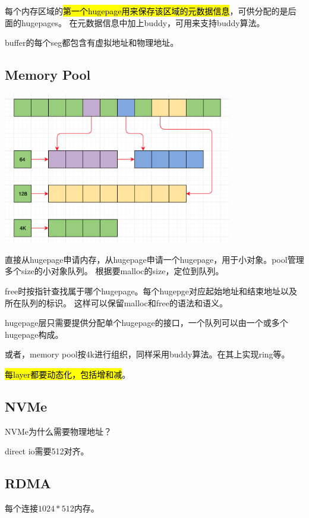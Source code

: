每个内存区域的\hl{第一个hugepage用来保存该区域的元数据信息}，可供分配的是后面的hugepages。
在元数据信息中加上buddy，可用来支持buddy算法。

buffer的每个seg都包含有虚拟地址和物理地址。

\subsection{Memory Pool}

\begin{center}
    \includegraphics[width=10cm]{../imgs/memory-pool.png}
\end{center}

直接从hugepage申请内存，从hugepage申请一个hugepage，用于小对象。pool管理多个size的小对象队列。
根据要malloc的size，定位到队列。

free时按指针查找属于哪个hugepage。每个hugepge对应起始地址和结束地址以及所在队列的标识。
这样可以保留malloc和free的语法和语义。

hugepage层只需要提供分配单个hugepage的接口，一个队列可以由一个或多个hugepage构成。

或者，memory pool按4k进行组织，同样采用buddy算法。在其上实现ring等。

\hl{每layer都要动态化，包括增和减}。

\subsection{NVMe}

NVMe为什么需要物理地址？

direct io需要512对齐。

\subsection{RDMA}

每个连接$1024*512$内存。

